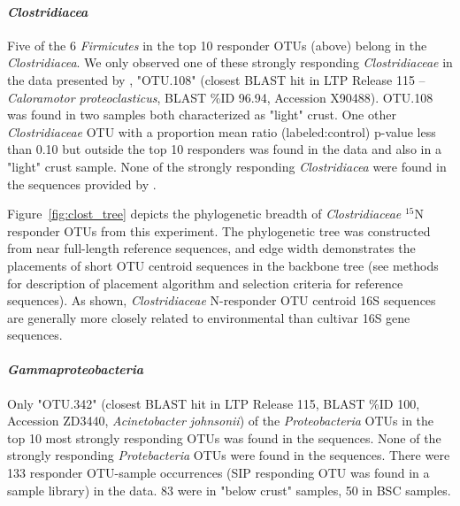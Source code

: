 \paragraph{\textit{Clostridiacea}}
Five of the 6 \textit{Firmicutes} in the top 10 responder OTUs (above) belong
in the \textit{Clostridiacea}. We only observed one of these strongly
responding
\textit{Clostridiaceae} in the data presented by \citet{Garcia_Pichel_2013},
"OTU.108" (closest BLAST hit in LTP Release 115 -- \textit{Caloramotor
proteoclasticus}, BLAST \%ID 96.94, Accession X90488). OTU.108 was found in two
samples both characterized as "light" crust. One other \textit{Clostridiaceae}
OTU with a proportion mean ratio (labeled:control) p-value less than 0.10 but
outside the top 10 responders was found in the \citet{Garcia_Pichel_2013} data
and also in a "light" crust sample. None of the strongly responding
\textit{Clostridiacea} were found in the sequences provided by
\citet{Steven_2013}.

Figure~\ref{fig:clost_tree} depicts the phylogenetic breadth of
\textit{Clostridiaceae} $^{15}$N responder OTUs from this experiment. The phylogenetic
tree was constructed from near full-length reference sequences, and edge
width demonstrates the placements of short OTU centroid sequences in the
backbone tree (see methods for description of placement algorithm and selection
criteria for reference sequences). As shown, \textit{Clostridiaceae}
N-responder OTU centroid 16S sequences are generally more closely related to
environmental than cultivar 16S gene sequences.   

\paragraph{\textit{Gammaproteobacteria}} Only "OTU.342" (closest BLAST hit in
LTP Release 115, BLAST \%ID 100, Accession ZD3440, \textit{Acinetobacter
johnsonii}) of the \textit{Proteobacteria} OTUs in the top 10 most strongly
responding OTUs was found in the \citet{Garcia_Pichel_2013} sequences. None of
the strongly responding \textit{Protebacteria} OTUs were found in the
\citet{Steven_2013} sequences. There were 133 responder OTU-sample occurrences
(SIP responding OTU was found in a sample library) in the \citet{Steven_2013}
data. 83 were in "below crust" samples, 50 in BSC samples.


